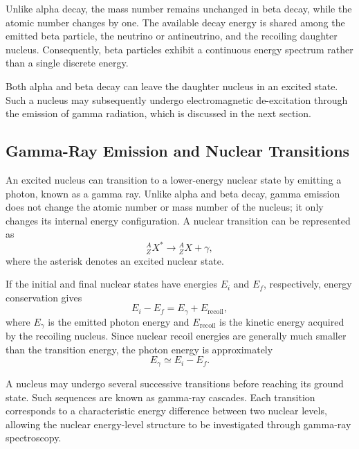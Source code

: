 \begin{itemize}
Unlike alpha decay, the mass number remains unchanged in beta decay, while the atomic number changes by one. The available decay energy is shared among the emitted beta particle, the neutrino or antineutrino, and the recoiling daughter nucleus. Consequently, beta particles exhibit a continuous energy spectrum rather than a single discrete energy.

Both alpha and beta decay can leave the daughter nucleus in an excited state. Such a nucleus may subsequently undergo electromagnetic de-excitation through the emission of gamma radiation, which is discussed in the next section.

\end{itemize}

\subsection{Gamma-Ray Emission and Nuclear Transitions}

An excited nucleus can transition to a lower-energy nuclear state by emitting a photon, known as a gamma ray. Unlike alpha and beta decay, gamma emission does not change the atomic number or mass number of the nucleus; it only changes its internal energy configuration. A nuclear transition can be represented as
\begin{equation}
    {}^{A}_{Z}X^*
    \longrightarrow
    {}^{A}_{Z}X + \gamma,
\end{equation}
where the asterisk denotes an excited nuclear state.

If the initial and final nuclear states have energies $E_i$ and $E_f$, respectively, energy conservation gives
\begin{equation}
    E_i-E_f = E_\gamma + E_{\mathrm{recoil}},
\end{equation}
where $E_\gamma$ is the emitted photon energy and $E_{\mathrm{recoil}}$ is the kinetic energy acquired by the recoiling nucleus. Since nuclear recoil energies are generally much smaller than the transition energy, the photon energy is approximately
\begin{equation}
    E_\gamma \simeq E_i-E_f.
\end{equation}

A nucleus may undergo several successive transitions before reaching its ground state. Such sequences are known as gamma-ray cascades. Each transition corresponds to a characteristic energy difference between two nuclear levels, allowing the nuclear energy-level structure to be investigated through gamma-ray spectroscopy.

